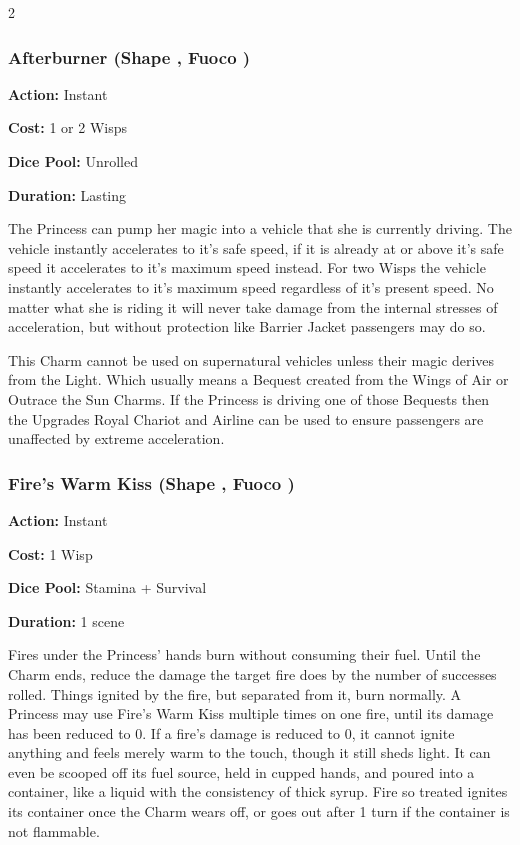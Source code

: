 \begin{multicols}{2}
\subsubsection*{Afterburner (Shape \textbullet, Fuoco \textbullet\textbullet)}

\noindent \textbf{Action:} Instant

\noindent \textbf{Cost:} 1 or 2 Wisps

\noindent \textbf{Dice Pool:} Unrolled

\noindent \textbf{Duration:} Lasting

The Princess can pump her magic into a vehicle that she is currently driving. The vehicle instantly accelerates to it's safe speed, if it is already at or above it's safe speed it accelerates to it's maximum speed instead. For two Wisps the vehicle instantly accelerates to it's maximum speed regardless of it's present speed. No matter what she is riding it will never take damage from the internal stresses of acceleration, but without protection like Barrier Jacket passengers may do so.

This Charm cannot be used on supernatural vehicles unless their magic derives from the Light. Which usually means a Bequest created from the Wings of Air or Outrace the Sun Charms. If the Princess is driving one of those Bequests then the Upgrades Royal Chariot and Airline can be used to ensure passengers are unaffected by extreme acceleration.  

\subsubsection*{Fire's Warm Kiss (Shape \textbullet, Fuoco \textbullet\textbullet)}

\noindent \textbf{Action:} Instant

\noindent \textbf{Cost:} 1 Wisp

\noindent \textbf{Dice Pool:} Stamina + Survival

\noindent \textbf{Duration:} 1 scene

Fires under the Princess' hands burn without consuming their fuel. Until the Charm ends, reduce the damage the target fire does by the number of successes rolled. Things ignited by the fire, but separated from it, burn normally. A Princess may use Fire's Warm Kiss multiple times on one fire, until its damage has been reduced to 0. If a fire's damage is reduced to 0, it cannot ignite anything and feels merely warm to the touch, though it still sheds light. It can even be scooped off its fuel source, held in cupped hands, and poured into a container, like a liquid with the consistency of thick syrup. Fire so treated ignites its container once the Charm wears off, or goes out after 1 turn if the container is not flammable.


\end{multicols}

